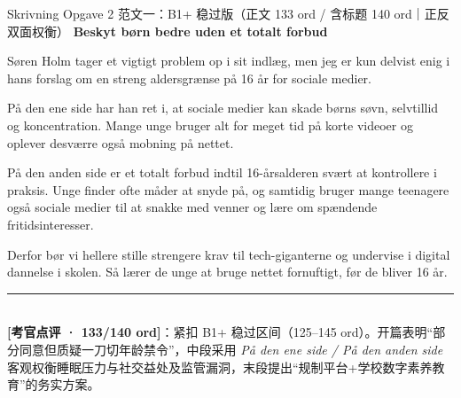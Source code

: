 \begin{emailbox}{Skrivning Opgave 2 范文一：B1+ 稳过版（正文 133 ord / 含标题 140 ord｜正反双面权衡）}
\textbf{\color{NCDNavy}Beskyt børn bedre uden et totalt forbud}

\vspace{0.25em}
Søren Holm tager et vigtigt problem op i sit indlæg, men jeg er kun delvist enig i hans forslag om en streng aldersgrænse på 16 år for sociale medier.

\vspace{0.25em}
På den ene side har han ret i, at sociale medier kan skade børns søvn, selvtillid og koncentration. Mange unge bruger alt for meget tid på korte videoer og oplever desværre også mobning på nettet.

\vspace{0.25em}
På den anden side er et totalt forbud indtil 16-årsalderen svært at kontrollere i praksis. Unge finder ofte måder at snyde på, og samtidig bruger mange teenagere også sociale medier til at snakke med venner og lære om spændende fritidsinteresser.

\vspace{0.25em}
Derfor bør vi hellere stille strengere krav til tech-giganterne og undervise i digital dannelse i skolen. Så lærer de unge at bruge nettet fornuftigt, før de bliver 16 år.

\vspace{0.3em}
\rule{\linewidth}{0.4pt}\\[0.2em]
\small\textbf{\color{NCDTeal}[考官点评 · 133/140 ord]}：紧扣 B1+ 稳过区间（125--145 ord）。开篇表明“部分同意但质疑一刀切年龄禁令”，中段采用 \textit{På den ene side / På den anden side} 客观权衡睡眠压力与社交益处及监管漏洞，末段提出“规制平台+学校数字素养教育”的务实方案。
\end{emailbox}

